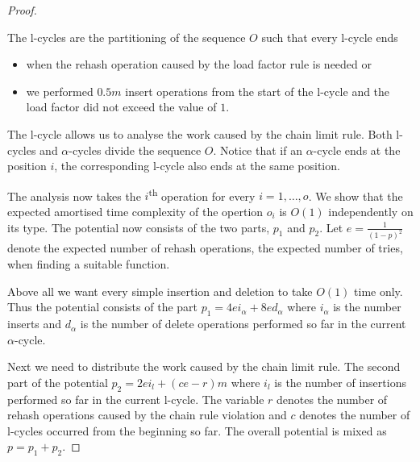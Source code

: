 \begin{proof}
\begin{definition}[l-cycle]
The l-cycles are the partitioning of the sequence $O$ such that every l-cycle ends
\begin{itemize}
\item when the rehash operation caused by the load factor rule is needed or
\item we performed $0.5 m$ insert operations from the start of the l-cycle and the load factor did not exceed the value of $1$.
\end{itemize}
\end{definition}
The l-cycle allows us to analyse the work caused by the chain limit rule. Both l-cycles and $\alpha$-cycles divide the sequence $O$. Notice that if an $\alpha$-cycle ends at the position $i$, the corresponding l-cycle also ends at the same position. 

The analysis now takes the $i$\textsuperscript{th} operation for every $i = 1, \dots, o$. We show that the expected amortised time complexity of the opertion $o_i$ is $O(1)$ independently on its type. The potential now consists of the two parts, $p_1$ and $p_2$. Let $e = \frac{1}{(1 - p) ^ 2}$ denote the expected number of rehash operations, the expected number of tries, when finding a suitable function. 

Above all we want every simple insertion and deletion to take $O(1)$ time only. Thus the potential consists of the part $p_1 = 4ei_{\alpha} + 8ed_{\alpha}$ where $i_{\alpha}$ is the number inserts and $d_{\alpha}$ is the number of delete operations performed so far in the current $\alpha$-cycle. 

Next we need to distribute the work caused by the chain limit rule. The second part of the potential $p_2 = 2ei_{l} + (ce - r) m$ where $i_l$ is the number of insertions performed so far in the current l-cycle. The variable $r$ denotes the number of rehash operations caused by the chain rule violation and $c$ denotes the number of l-cycles occurred from the beginning so far. The overall potential is mixed as $p = p_1 + p_2$.


\end{proof}
